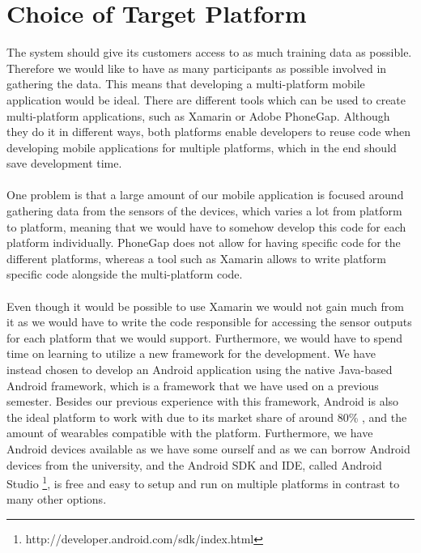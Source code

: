 
\section{Choice of Target Platform}
\label{sec:choice_of_platform}

The system should give its customers access to as much training data as possible. Therefore we would like to have as many participants as possible involved in gathering the data. This means that developing a multi-platform mobile application would be ideal. There are different tools which can be used to create multi-platform applications, such as Xamarin or Adobe PhoneGap. Although they do it in different ways, both platforms enable developers to reuse code when developing mobile applications for multiple platforms, which in the end should save development time. 
\\\\
One problem is that a large amount of our mobile application is focused around gathering data from the sensors of the devices, which varies a lot from platform to platform, meaning that we would have to somehow develop this code for each platform individually. PhoneGap does not allow for having specific code for the different platforms, whereas a tool such as Xamarin allows to write platform specific code alongside the multi-platform code. 
\\\\
Even though it would be possible to use Xamarin we would not gain much from it as we would have to write the code responsible for accessing the sensor outputs for each platform that we would support. Furthermore, we would have to spend time on learning to utilize a new framework for the development. We have instead chosen to develop an Android application using the native Java-based Android framework, which is a framework that we have used on a previous semester. Besides our previous experience with this framework, Android is also the ideal platform to work with due to its market share of around 80\% \parencite{android_os_market_share}, and the amount of wearables compatible with the platform. Furthermore, we have Android devices available as we have some ourself and as we can borrow Android devices from the university, and the Android SDK and IDE, called Android Studio \footnote{http://developer.android.com/sdk/index.html}, is free and easy to setup and run on multiple platforms in contrast to many other options. 

